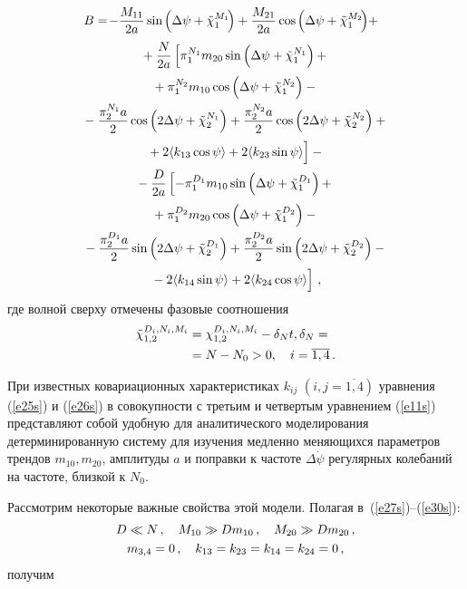 \begin{multicols}{2}
\begin{multline}
\!\!\!\!B=\!-\fr{M_{11}}{2a} \sin \hspace*{-.4pt}\left(\Delta \psi+\tilde \chi_1^{M_1}\!\right)+
\fr {M_{21}}{2a} \cos \hspace*{-0.4pt}\left(\Delta \psi+\tilde \chi_1^{M_2}\!\right)\!+\\
{}+\fr{N}{2a} \left[ \pi_1^{N_1} m_{20} \sin \left(\Delta \psi+\tilde \chi_1^{N_1}\right)+\right.{}\\
{}+ \pi_1^{N_2} m_{10} \cos \left(\Delta \psi+\tilde \chi_1^{N_2}\right)-{}\\
{}-\fr{\pi_2^{N_1} a}{ 2} \cos \left(2\Delta \psi+\tilde \chi_2^{N_1}\right)+
\fr {\pi_2^{N_2} a}{ 2} \cos \left(2\Delta \psi+\tilde \chi_2^{N_2}\right)+{}\\
\left. \vphantom{\pi_2^{N_1}}{}+2 \langle k_{13}\cos\psi\rangle + 2 \langle k_{23}\sin\psi\rangle\right] -{}\\
{}- \fr{D}{2a} \left[
 - \pi_1^{D_1} m_{10} \sin \left(\Delta \psi +\tilde\chi_1^{D_1}\right) + \right.{}\\
{}+\pi_1^{D_2} m_{20} \cos \left(\Delta \psi +\tilde\chi_1^{D_2}\right)-{}\\
{}- \fr{\pi_2^{D_1} a}{ 2} \sin \left(2\Delta \psi +\tilde\chi_2^{D_1}\right) +
\fr{\pi_2^{D_2}a}{2}
 \sin \left(2\Delta \psi+\tilde\chi_2^{D_2}\right)-{}\\
\left. \vphantom{\pi_2^{N_1}}{}-2 \langle k_{14}\sin\psi\rangle + 2
 \langle k_{24}\cos\psi\rangle \right]\,,\label{e30s}
 \end{multline}
где волной сверху отмечены фазовые соотношения
\begin{align}
\tilde\chi_{1,2}^{D_i,N_i,M_i}&=\chi_{1,2}^{D_i,N_i,M_i}-\delta_N t, \delta_N ={}\notag\\
&= N-N_0 >0,  \quad i=\overline{1,4}\,.
 \label{e31s}
 \end{align}

При известных ковариационных характеристиках $k_{ij}$
$(i,j=\overline{1,4})$ уравнения (\ref{e25s}) и (\ref{e26s}) в совокупности с третьим
и четвертым уравнением (\ref{e11s}) представляют собой удобную для
аналитического моделирования детерминированную систему для изучения
медленно меняющихся параметров трендов $m_{10}, m_{20}$, амплитуды
$a$ и поправки к частоте $\Delta \dot\psi$ регулярных колебаний на
частоте, близкой к $N_0$.

Рассмотрим некоторые важные свойства этой модели. Полагая в~(\ref{e27s})--(\ref{e30s}):
\begin{gather}
D\ll N\,, \quad M_{10}\gg D m_{10}\,, \quad M_{20} \gg Dm_{20}\,,\notag\\
 m_{3,4} =0\,, \quad k_{13} = k_{23} = k_{14} = k_{24} =0\,,\label{e32s}
 \end{gather}
получим


\end{multicols}
